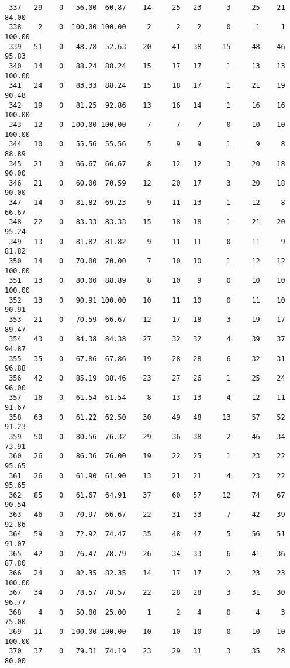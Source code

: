 \begin{verbatim}
 337   29    0   56.00  60.87    14     25   23      3     25    21    84.00
 338    2    0  100.00 100.00     2      2    2      0      1     1   100.00
 339   51    0   48.78  52.63    20     41   38     15     48    46    95.83
 340   14    0   88.24  88.24    15     17   17      1     13    13   100.00
 341   24    0   83.33  88.24    15     18   17      1     21    19    90.48
 342   19    0   81.25  92.86    13     16   14      1     16    16   100.00
 343   12    0  100.00 100.00     7      7    7      0     10    10   100.00
 344   10    0   55.56  55.56     5      9    9      1      9     8    88.89
 345   21    0   66.67  66.67     8     12   12      3     20    18    90.00
 346   21    0   60.00  70.59    12     20   17      3     20    18    90.00
 347   14    0   81.82  69.23     9     11   13      1     12     8    66.67
 348   22    0   83.33  83.33    15     18   18      1     21    20    95.24
 349   13    0   81.82  81.82     9     11   11      0     11     9    81.82
 350   14    0   70.00  70.00     7     10   10      1     12    12   100.00
 351   13    0   80.00  88.89     8     10    9      0     10    10   100.00
 352   13    0   90.91 100.00    10     11   10      0     11    10    90.91
 353   21    0   70.59  66.67    12     17   18      3     19    17    89.47
 354   43    0   84.38  84.38    27     32   32      4     39    37    94.87
 355   35    0   67.86  67.86    19     28   28      6     32    31    96.88
 356   42    0   85.19  88.46    23     27   26      1     25    24    96.00
 357   16    0   61.54  61.54     8     13   13      4     12    11    91.67
 358   63    0   61.22  62.50    30     49   48     13     57    52    91.23
 359   50    0   80.56  76.32    29     36   38      2     46    34    73.91
 360   26    0   86.36  76.00    19     22   25      1     23    22    95.65
 361   26    0   61.90  61.90    13     21   21      4     23    22    95.65
 362   85    0   61.67  64.91    37     60   57     12     74    67    90.54
 363   46    0   70.97  66.67    22     31   33      7     42    39    92.86
 364   59    0   72.92  74.47    35     48   47      5     56    51    91.07
 365   42    0   76.47  78.79    26     34   33      6     41    36    87.80
 366   24    0   82.35  82.35    14     17   17      2     23    23   100.00
 367   34    0   78.57  78.57    22     28   28      3     31    30    96.77
 368    4    0   50.00  25.00     1      2    4      0      4     3    75.00
 369   11    0  100.00 100.00    10     10   10      0     10    10   100.00
 370   37    0   79.31  74.19    23     29   31      3     35    28    80.00

\end{verbatim}
